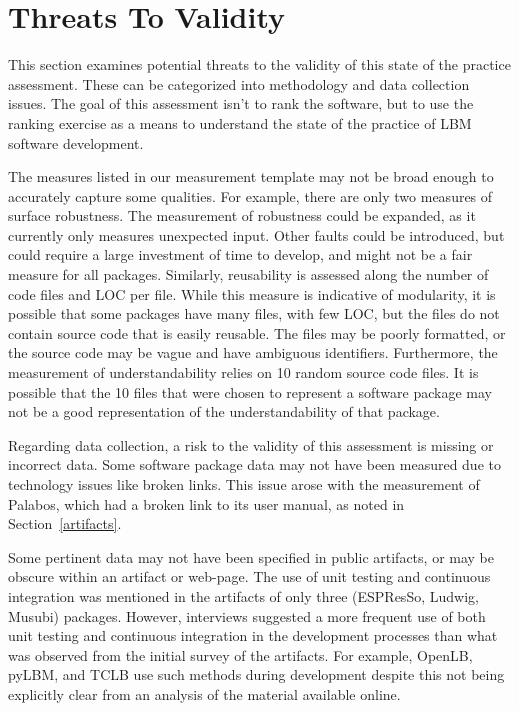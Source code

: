 \documentclass[final, 3p, times, authoryear]{elsarticle}
\begin{document}
\section{Threats To Validity} \label{threats}

This section examines potential threats to the validity of this state of the
practice assessment. These can be categorized into methodology and data
collection issues. The goal of this assessment isn't to rank the software, but
to use the ranking exercise as a means to understand the state of the practice
of LBM software development.

The measures listed in our measurement template may not be broad enough to
accurately capture some qualities. For example, there are only two measures of
surface robustness. The measurement of robustness could be expanded, as it
currently only measures unexpected input. Other faults could be introduced, but
could require a large investment of time to develop, and might not be a fair
measure for all packages. Similarly, reusability is assessed along the number of
code files and LOC per file. While this measure is indicative of modularity, it
is possible that some packages have many files, with few LOC, but the files do
not contain source code that is easily reusable. The files may be poorly
formatted, or the source code may be vague and have ambiguous identifiers.
Furthermore, the measurement of understandability relies on 10 random source
code files. It is possible that the 10 files that were chosen to represent a
software package may not be a good representation of the understandability of
that package.

Regarding data collection, a risk to the validity of this assessment is missing
or incorrect data. Some software package data may not have been measured due to
technology issues like broken links. This issue arose with the measurement of
Palabos, which had a broken link to its user manual, as noted in
Section~\ref{artifacts}. 

Some pertinent data may not have been specified in public artifacts, or may be
obscure within an artifact or web-page. The use of unit testing and continuous
integration was mentioned in the artifacts of only three (ESPResSo, Ludwig,
Musubi) packages. However, interviews suggested a more frequent use of both unit
testing and continuous integration in the development processes than what was
observed from the initial survey of the artifacts. For example, OpenLB, pyLBM,
and TCLB use such methods during development despite this not being explicitly
clear from an analysis of the material available online. 
\end{document}
